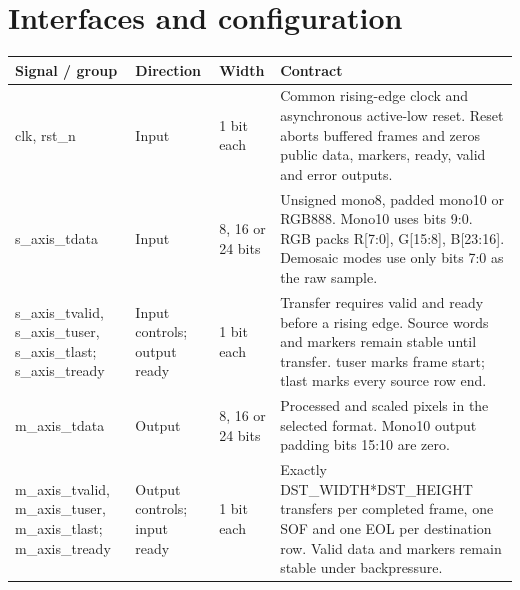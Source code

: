 \documentclass[11pt,a4paper]{article}
\begin{document}
\section{Interfaces and configuration}

{\small\renewcommand{\arraystretch}{1.18}\begin{longtable}{@{}L{0.21\textwidth}|L{0.12\textwidth}|L{0.12\textwidth}|L{0.45\textwidth}@{}}\toprule

\textbf{Signal /\allowbreak{} group} & \textbf{Direction} & \textbf{Width} & \textbf{Contract}\\\midrule\endhead

clk,\allowbreak{} rst\_\allowbreak{}n & Input & 1 bit each & Common rising-edge clock and asynchronous active-low reset. Reset aborts buffered frames and zeros public data,\allowbreak{} markers,\allowbreak{} ready,\allowbreak{} valid and error outputs.\\[2pt]\hline

s\_\allowbreak{}axis\_\allowbreak{}tdata & Input & 8,\allowbreak{} 16 or 24 bits & Unsigned mono8,\allowbreak{} padded mono10 or RGB888. Mono10 uses bits 9:0. RGB packs R[\allowbreak{}7:0]\allowbreak{},\allowbreak{} G[\allowbreak{}15:8]\allowbreak{},\allowbreak{} B[\allowbreak{}23:16]\allowbreak{}. Demosaic modes use only bits 7:0 as the raw sample.\\[2pt]\hline

s\_\allowbreak{}axis\_\allowbreak{}tvalid,\allowbreak{} s\_\allowbreak{}axis\_\allowbreak{}tuser,\allowbreak{} s\_\allowbreak{}axis\_\allowbreak{}tlast; s\_\allowbreak{}axis\_\allowbreak{}tready & Input controls; output ready & 1 bit each & Transfer requires valid and ready before a rising edge. Source words and markers remain stable until transfer. tuser marks frame start; tlast marks every source row end.\\[2pt]\hline

m\_\allowbreak{}axis\_\allowbreak{}tdata & Output & 8,\allowbreak{} 16 or 24 bits & Processed and scaled pixels in the selected format. Mono10 output padding bits 15:10 are zero.\\[2pt]\hline

m\_\allowbreak{}axis\_\allowbreak{}tvalid,\allowbreak{} m\_\allowbreak{}axis\_\allowbreak{}tuser,\allowbreak{} m\_\allowbreak{}axis\_\allowbreak{}tlast; m\_\allowbreak{}axis\_\allowbreak{}tready & Output controls; input ready & 1 bit each & Exactly DST\_\allowbreak{}WIDTH*\allowbreak{}DST\_\allowbreak{}HEIGHT transfers per completed frame,\allowbreak{} one SOF and one EOL per destination row. Valid data and markers remain stable under backpressure.\\[2pt]\hline


\end{longtable}}
\end{document}

